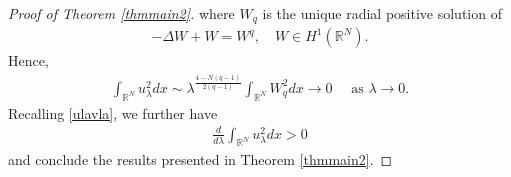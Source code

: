 \documentclass{article}
\theoremstyle{definition} \theoremstyle{remark}
\numberwithin{equation}{section}
\newcommand{\R}{\mathbb{R}}
\newcommand{\la}{\lambda}
\begin{document}
\begin{proof}[Proof of Theorem \ref{thmmain2}]
		where $W_q$ is the unique radial positive solution of
		\begin{align*}
			-\Delta W + W = W^q, \quad W \in H^1(\R^N).
		\end{align*}
		Hence,
		\begin{align*}
			\int_{\R^N}u_\la^2dx \sim \la^{\frac{4-N(q-1)}{2(q-1)}} \int_{\R^N}W_q^2dx \to 0 \quad \text{ as } \la \to 0.
		\end{align*}
		Recalling \eqref{ulavla}, we further have
		\begin{align*}
			\frac{d}{d\la}\int_{\R^N}u_\la^2dx > 0
		\end{align*}
		and conclude the results presented in Theorem \ref{thmmain2}.
	\end{proof}


\medskip
\end{document}
